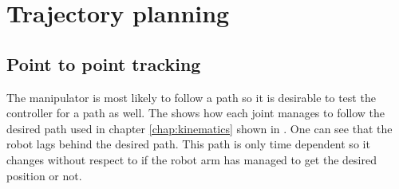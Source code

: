 \section{Trajectory planning}
\subsection{Point to point tracking}
The manipulator is most likely to follow a path so it is desirable to test the controller for a path as well. The  shows how each joint manages to follow the desired path used in chapter \ref{chap:kinematics} shown in  . One can see that the robot lags behind the desired path. This path is only time dependent so it changes without respect to if the robot arm has managed to get the desired position or not.\\\\
\def\picsSiz{1.08}
